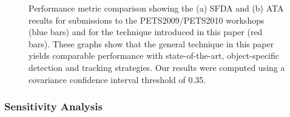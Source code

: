 \documentclass[smallcondensed, final]{svjour3}
\begin{document}
\begin{figure}[!]
  \centering
  \hspace{1mm}
  \caption{Performance metric comparison showing the (a) SFDA and (b) ATA results for submissions to the PETS2009/PETS2010 workshops (blue bars) and for the technique introduced in this paper (red bars). These graphs show that the general technique in this paper yields comparable performance with state-of-the-art, object-specific detection and tracking strategies. Our results were computed using a covariance confidence interval threshold of 0.35.}
  \label{fig:sfda_and_ata_comparison}
\end{figure}




\subsubsection{Sensitivity Analysis}
\label{sec:sens_analysis}
\end{document}
